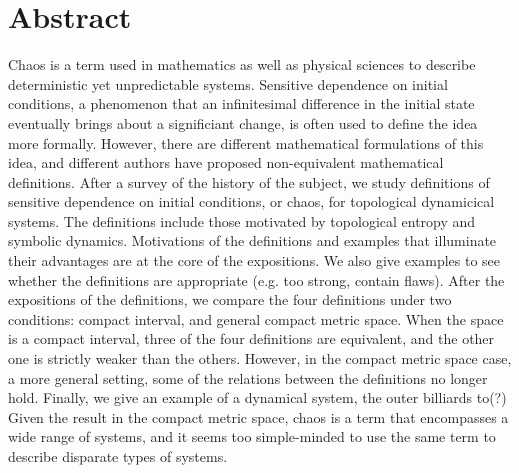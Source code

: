 \documentclass[12pt,twoside,draft]{book}
\begin{document}
\chapter{Abstract}
Chaos is a term used in mathematics as well as physical sciences to describe deterministic yet unpredictable systems.
Sensitive dependence on initial conditions, a phenomenon that an infinitesimal difference in the initial state eventually brings about a significiant change, is often used to define the idea more formally.
However, there are different mathematical formulations of this idea, and different authors have proposed non-equivalent mathematical definitions.
After a survey of the history of the subject, we study definitions of sensitive dependence on initial conditions, or chaos, for topological dynamicical systems.
The definitions include those motivated by topological entropy and symbolic dynamics.
Motivations of the definitions and examples that illuminate their advantages are at the core of the expositions.
We also give examples to see whether the definitions are appropriate (e.g. too strong, contain flaws).
After the expositions of the definitions, we compare the four definitions under two conditions: compact interval, and general compact metric space.
When the space is a compact interval, three of the four definitions are equivalent, and the other one is strictly weaker than the others.
However, in the compact metric space case, a more general setting, some of the relations between the definitions no longer hold.
Finally, we give an example of a dynamical system, the outer billiards to(?)
Given the result in the compact metric space, chaos is a term that encompasses a wide range of systems, and it seems too simple-minded to use the same term to describe disparate types of systems.
 
\end{document}
